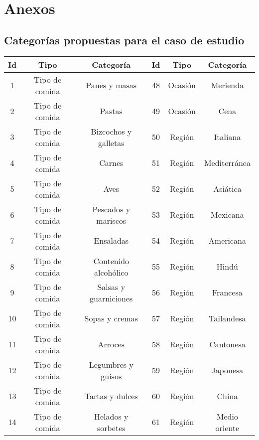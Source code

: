 \newpage
\chapter{Anexos}
\section{Categorías propuestas para el caso de estudio}
  \begin{table}[h]
    \begin{center}
      \begin{tabular}{ | c | c | c | c | c | c |}
        \toprule
        Id & Tipo & Categoría & Id & Tipo & Categoría\\
        \midrule
        1 & Tipo de comida & Panes y masas  & 48 & Ocasión   & Merienda \\
        \midrule
        2 & Tipo de comida & Pastas  & 49 & Ocasión   & Cena \\
        \midrule
        3 & Tipo de comida & Bizcochos y galletas  & 50 & Región   & Italiana \\
        \midrule
        4 & Tipo de comida & Carnes  & 51 & Región   & Mediterránea \\
        \midrule
        5 & Tipo de comida & Aves  & 52 & Región   & Asiática \\
        \midrule
        6 & Tipo de comida & Pescados y mariscos  & 53 & Región   & Mexicana \\
        \midrule
        7 & Tipo de comida & Ensaladas  & 54 & Región   & Americana \\
        \midrule
        8 & Tipo de comida & Contenido alcohólico  & 55 & Región   & Hindú \\
        \midrule
        9 & Tipo de comida & Salsas y guarniciones  & 56 & Región   & Francesa \\
        \midrule
        10 & Tipo de comida & Sopas y cremas  & 57 & Región   & Tailandesa \\
        \midrule
        11 & Tipo de comida & Arroces  & 58 & Región   & Cantonesa \\
        \midrule
        12 & Tipo de comida & Legumbres y guisos  & 59 & Región   & Japonesa \\
        \midrule
        13 & Tipo de comida & Tartas y dulces  & 60 & Región   & China \\
        \midrule
        14 & Tipo de comida & Helados y sorbetes  & 61 & Región   & Medio oriente \\

\end{tabular}
\end{center}
\end{table}
